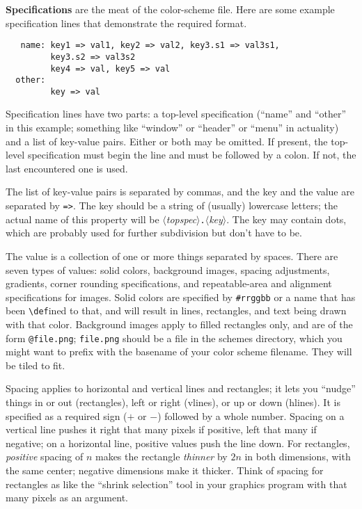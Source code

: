 \documentclass[12pt,letterpaper]{report}
\def\<#1>{\leavevmode\hbox{$\langle${\sl#1\/}$\rangle$}}
\begin{document}
{\bf Specifications} are the meat of the color-scheme file. Here are some example specification lines
that demonstrate the required format.
\begin{verbatim}
   name: key1 => val1, key2 => val2, key3.s1 => val3s1,
         key3.s2 => val3s2
         key4 => val, key5 => val
  other:
         key => val
\end{verbatim}
Specification lines have two parts: a top-level specification (``name'' and ``other'' in this example;
something like ``window'' or ``header'' or ``menu'' in actuality) and a list of key-value pairs. Either
or both may be omitted. If present, the top-level specification must begin the line and must be followed
by a colon. If not, the last encountered one is used.

The list of key-value pairs is separated by commas, and the key and the value are separated by \verb|=>|.
The key should be a string of (usually) lowercase letters; the actual name of this property will be
\<topspec>\verb|.|\<key>. The key may contain dots, which are probably used for further subdivision
but don't have to be.

The value is a collection of one or more things separated by spaces. There are seven types of values:
solid colors, background images, spacing adjustments, gradients, corner rounding specifications,
and repeatable-area and alignment specifications for images. Solid colors are specified by \verb|#rrggbb|
or a name that has been \verb|\def|ined to that, and will result in lines, rectangles, and text being
drawn with that color. Background images apply to filled rectangles only, and are of the form \verb|@file.png|;
\verb|file.png| should be a file in the schemes directory, which you might want to prefix with the
basename of your color scheme filename. They will be tiled to fit.

Spacing applies to horizontal and vertical lines and rectangles; it lets you ``nudge'' things in or out
(rectangles), left or right (vlines), or up or down (hlines). It is specified as a required sign ($+$ or $-$)
followed by a whole number. Spacing on a vertical line pushes it right that many pixels if positive, left that
many if negative; on a horizontal line, positive values push the line down. For rectangles, {\it positive}
spacing of $n$ makes the rectangle {\it thinner} by $2n$ in both dimensions, with the same center; negative
dimensions make it thicker. Think of spacing for rectangles as like the ``shrink selection'' tool in your graphics program
with that many pixels as an argument.
\end{document}
